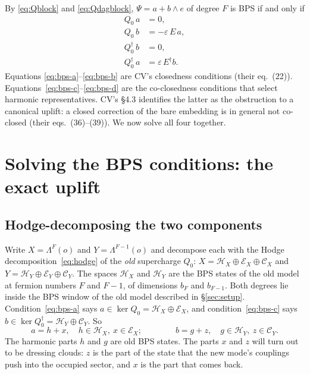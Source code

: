 \documentclass[11pt]{article}
\newcommand{\eps}{\varepsilon}
\newcommand{\Hc}{\mathcal H}
\newcommand{\Ec}{\mathcal E}
\newcommand{\Cc}{\mathcal C}
\theoremstyle{plain}
\theoremstyle{remark}
\numberwithin{equation}{section}
\begin{document}
By \eqref{eq:Qblock} and \eqref{eq:Qdagblock}, $\Psi=a+b\wedge e$ of degree $F$ is BPS if and only if
\begin{subequations}\label{eq:bps}
\begin{align}
Q_0\,a&=0, \label{eq:bps-a}\\
Q_0\,b&=-\eps\,E\,a, \label{eq:bps-b}\\
Q_0^\dagger\,b&=0, \label{eq:bps-c}\\
Q_0^\dagger\,a&=\eps\,E^\dagger b. \label{eq:bps-d}
\end{align}
\end{subequations}
Equations \eqref{eq:bps-a}--\eqref{eq:bps-b} are CV's closedness conditions (their eq.~(22)).
Equations~\eqref{eq:bps-c}--\eqref{eq:bps-d} are the co-closedness conditions that select harmonic representatives. CV's
\S4.3 identifies the latter as the obstruction to a canonical uplift: a closed correction of the bare embedding is in
general not co-closed (their eqs.~(36)--(39)). We now solve all four together.

\section{Solving the BPS conditions: the exact uplift}\label{sec:uplift}

\subsection{Hodge-decomposing the two components}

Write $X=\Lambda^F(o)$ and $Y=\Lambda^{F-1}(o)$ and decompose each with the Hodge decomposition~\eqref{eq:hodge} of the
\emph{old} supercharge $Q_0$:
$X=\Hc_X\oplus\Ec_X\oplus\Cc_X$ and $Y=\Hc_Y\oplus\Ec_Y\oplus\Cc_Y$. The spaces $\Hc_X$ and $\Hc_Y$ are the BPS states
of the old model at fermion numbers $F$ and $F-1$, of dimensions $b_F$ and $b_{F-1}$. Both degrees lie inside the BPS
window of the old model described in \S\ref{sec:setup}. Condition~\eqref{eq:bps-a} says
$a\in\ker Q_0=\Hc_X\oplus\Ec_X$, and condition~\eqref{eq:bps-c} says $b\in\ker Q_0^\dagger=\Hc_Y\oplus\Cc_Y$. So
\begin{equation}\label{eq:ab}
a=h+x,\quad h\in\Hc_X,\ x\in\Ec_X;\qquad\qquad b=g+z,\quad g\in\Hc_Y,\ z\in\Cc_Y .
\end{equation}
The harmonic parts $h$ and $g$ are old BPS states. The parts $x$ and $z$ will turn out to be dressing clouds: $z$ is
the part of the state that the new mode's couplings push into the occupied sector, and $x$ is the part that comes back.
\end{document}
